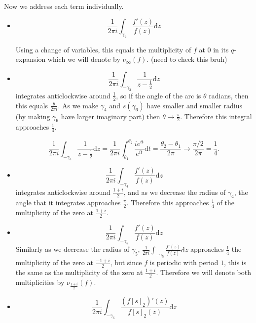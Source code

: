 \documentclass{article}
\theoremstyle{definition}
\theoremstyle{definition}
\theoremstyle{definition}
\begin{document}
Now we address each term individually.  

\begin{itemize}
    \item[1.] $$\frac{1}{2 \pi i}  \int_{\gamma_2}
\frac{f' (z)}{f (z)} \mathrm{d} z$$

Using a change of variables, this equals the multiplicity of $f$ at $0$ in its
$q$-expansion which we will denote by $\nu_{\infty} (f)$. (need to check this bruh)

\item[2.]
$$\frac{1}{2 \pi i}  \int_{- \gamma_3} \frac{1}{z - \frac{1}{2}} \mathrm{d} z$$
integrates anticlockwise around $\frac{1}{2}$, so if the angle of the arc is
$\theta$ radians, then this equals $\frac{\theta}{2 \pi i}$. As we make
$\gamma_4$ and $s (\gamma_6)$ have smaller and smaller radius (by making
$\gamma_6$ have larger imaginary part) then $\theta \rightarrow
\frac{\pi}{2}$. Therefore this integral approaches $\frac{1}{4}$.

$$\frac{1}{2 \pi i}  \int_{- \gamma_3} \frac{1}{z - \frac{1}{2}} \mathrm{d} z=\frac{1}{2 \pi i}  \int_{\theta_1}^{\theta_2} \frac{ie^{it}}{e^{it}} \mathrm{d} t=\frac{\theta_2-\theta_1}{2\pi}\to \frac{\pi/2}{2\pi}=\frac{1}{4}.$$

\item[3.] $$\frac{1}{2 \pi i}  \int_{- \gamma_4} \frac{f' (z)}{f (z)} \mathrm{d} z$$
integrates anticlockwise around $\frac{1 + i}{2}$, and as we decrease the
radius of $\gamma_4$, the angle that it integrates approaches $\frac{\pi}{2}$.
Therefore this approaches $\frac{1}{4}$ of the multiplicity of the zero at
$\frac{1 + i}{2}$.

\item[4.] $$\frac{1}{2 \pi i}  \int_{- \gamma_5} \frac{f' (z)}{f (z)} \mathrm{d} z$$ Similarly as we decrease the radius of $\gamma_5$,
$\frac{1}{2 \pi i}  \int_{- \gamma_5} \frac{f' (z)}{f (z)} \mathrm{d} z$
approaches $\frac{1}{4}$ the multiplicity of the zero at $\frac{- 1 + i}{2}$,
but since $f$ is periodic with period $1$, this is the same as the
multiplicity of the zero at $\frac{1 + i}{2}$. Therefore we will denote both
multiplicities by $\nu_{\frac{1 + i}{2}} (f)$.

\item[5.] $$\frac{1}{2 \pi i}  \int_{- \gamma_6} \frac{(f [s]_2)'
(z)}{f[s]_2 (z)} \mathrm{d} z$$


\end{itemize}
\end{document}
